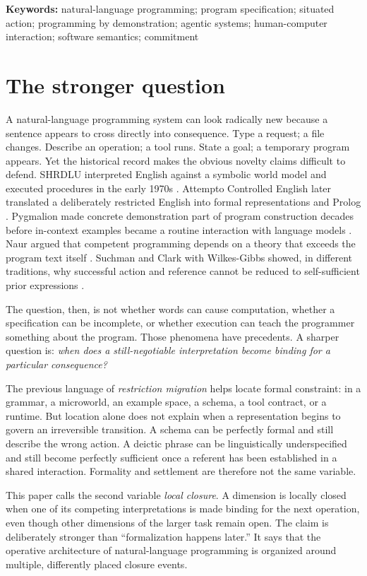 \documentclass[11pt]{article}
\newcommand{\term}[1]{\textit{#1}}
\begin{document}
\textbf{Keywords:} natural-language programming; program specification; situated action; programming by demonstration; agentic systems; human-computer interaction; software semantics; commitment

\section{The stronger question}
A natural-language programming system can look radically new because a sentence appears to cross directly into consequence. Type a request; a file changes. Describe an operation; a tool runs. State a goal; a temporary program appears. Yet the historical record makes the obvious novelty claims difficult to defend. SHRDLU interpreted English against a symbolic world model and executed procedures in the early 1970s \parencite{winograd1973procedural}. Attempto Controlled English later translated a deliberately restricted English into formal representations and Prolog \parencite{fuchs1996ace}. Pygmalion made concrete demonstration part of program construction decades before in-context examples became a routine interaction with language models \parencite{smith1993pygmalion}. Naur argued that competent programming depends on a theory that exceeds the program text itself \parencite{naur1985programming}. Suchman and Clark with Wilkes-Gibbs showed, in different traditions, why successful action and reference cannot be reduced to self-sufficient prior expressions \parencite{suchman1985plans,clarkwilkesgibbs1986}.

The question, then, is not whether words can cause computation, whether a specification can be incomplete, or whether execution can teach the programmer something about the program. Those phenomena have precedents. A sharper question is: \emph{when does a still-negotiable interpretation become binding for a particular consequence?}

The previous language of \term{restriction migration} helps locate formal constraint: in a grammar, a microworld, an example space, a schema, a tool contract, or a runtime. But location alone does not explain when a representation begins to govern an irreversible transition. A schema can be perfectly formal and still describe the wrong action. A deictic phrase can be linguistically underspecified and still become perfectly sufficient once a referent has been established in a shared interaction. Formality and settlement are therefore not the same variable.

This paper calls the second variable \term{local closure}. A dimension is locally closed when one of its competing interpretations is made binding for the next operation, even though other dimensions of the larger task remain open. The claim is deliberately stronger than ``formalization happens later.'' It says that the operative architecture of natural-language programming is organized around multiple, differently placed closure events.
\end{document}
